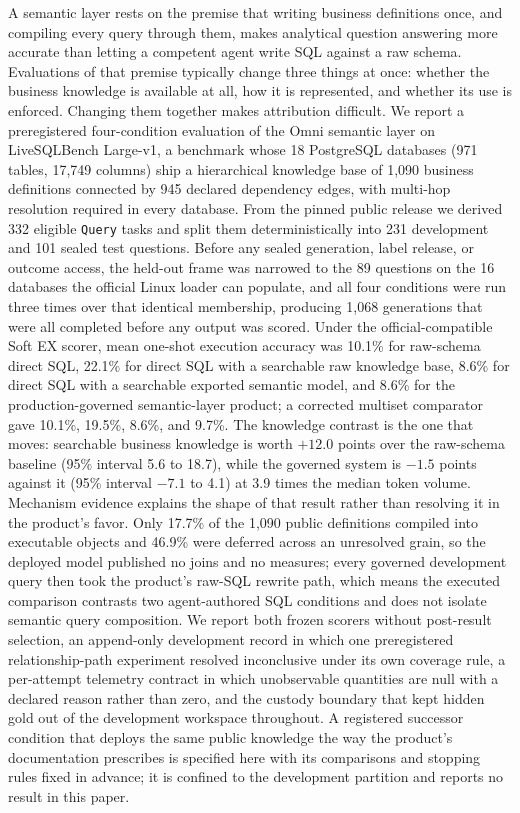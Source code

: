 A semantic layer rests on the premise that writing business definitions once, and
compiling every query through them, makes analytical question answering more
accurate than letting a competent agent write SQL against a raw schema.
Evaluations of that premise typically change three things at once: whether the
business knowledge is available at all, how it is represented, and whether its
use is enforced. Changing them together makes attribution difficult. We report a
preregistered four-condition evaluation of the Omni semantic layer on
LiveSQLBench Large-v1, a benchmark whose 18 PostgreSQL databases (971 tables,
17,749 columns) ship a hierarchical knowledge base of 1,090 business definitions
connected by 945 declared dependency edges, with multi-hop resolution required in
every database. From the pinned public release we derived 332 eligible
\texttt{Query} tasks and split them deterministically into 231 development and
101 sealed test questions. Before any sealed generation, label release, or
outcome access, the held-out frame was narrowed to the 89 questions on the 16
databases the official Linux loader can populate, and all four conditions were
run three times over that identical membership, producing 1,068 generations that
were all completed before any output was scored. Under the official-compatible
Soft EX scorer, mean one-shot execution accuracy was 10.1\% for raw-schema direct
SQL, 22.1\% for direct SQL with a searchable raw knowledge base, 8.6\% for direct
SQL with a searchable exported semantic model, and 8.6\% for the
production-governed semantic-layer product; a corrected multiset comparator gave
10.1\%, 19.5\%, 8.6\%, and 9.7\%. The knowledge contrast is the one that moves:
searchable business knowledge is worth $+12.0$ points over the raw-schema
baseline (95\% interval 5.6 to 18.7), while the governed system is $-1.5$ points
against it (95\% interval $-7.1$ to 4.1) at 3.9 times the median token volume.
Mechanism evidence explains the shape of that result rather than resolving it in
the product's favor. Only 17.7\% of the 1,090 public definitions compiled into
executable objects and 46.9\% were deferred across an unresolved grain, so the
deployed model published no joins and no measures; every governed development
query then took the product's raw-SQL rewrite path, which means the executed
comparison contrasts two agent-authored SQL conditions and does not isolate
semantic query composition. We report both frozen scorers without post-result
selection, an append-only development record in which one preregistered
relationship-path experiment resolved inconclusive under its own coverage rule,
a per-attempt telemetry contract in which unobservable quantities are null with a
declared reason rather than zero, and the custody boundary that kept hidden gold
out of the development workspace throughout. A registered successor condition
that deploys the same public knowledge the way the product's documentation
prescribes is specified here with its comparisons and stopping rules fixed in
advance; it is confined to the development partition and reports no result in
this paper.

